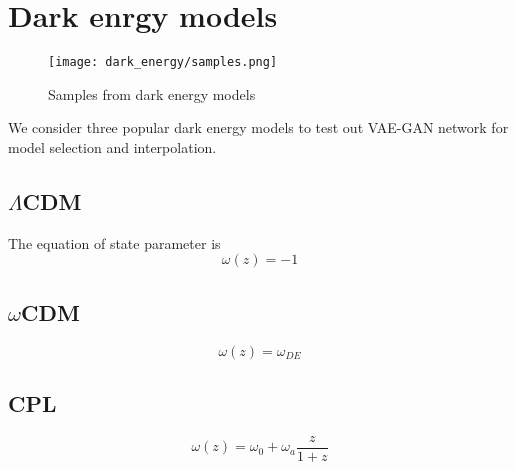 \section{Dark enrgy models}
\begin{figure}
	\centering
	\texttt{[image: dark\_energy/samples.png]}
	\caption{Samples from dark energy models}
	\label{fig:dark_energy_samples}
\end{figure}
We consider three popular dark energy models to test out VAE-GAN network for model selection and interpolation.
\subsection{$\Lambda$CDM}
The equation of state parameter is
\begin{equation}
	\omega(z)=-1
\end{equation}
\subsection{$\omega$CDM}
\begin{equation}
	\omega(z)=\omega_{D E}
\end{equation}
\subsection{CPL}
\begin{equation}
	\omega(z)=\omega_{0}+\omega_{a} \frac{z}{1+z}
\end{equation}
